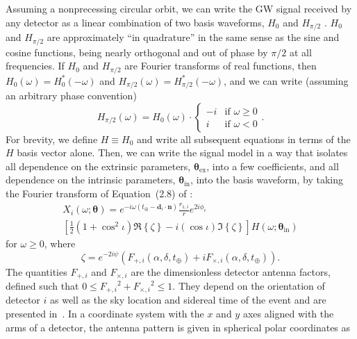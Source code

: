 \documentclass[amsmath,amssymb,aps,prx,reprint,nopreprintnumbers,nofootinbib]{revtex4-1}
\begin{document}
Assuming a nonprecessing circular orbit, we can write the \ac{GW} signal received by any detector as a linear combination of two basis waveforms, $H_0$ and $H_{\pi/2}$ \citep{PhysRevD.83.084002}. $H_0$ and $H_{\pi/2}$ are approximately ``in quadrature'' in the same sense as the sine and cosine functions, being nearly orthogonal and out of phase by ${\pi/2}$ at all frequencies. If $H_0$ and $H_{\pi/2}$ are Fourier transforms of real functions, then $H_0(\omega) = H_0^*(-\omega)$ and $H_{\pi/2}(\omega) = H_{\pi/2}^*(-\omega)$, and we can write (assuming an arbitrary phase convention)
%
\begin{equation}
    H_{\pi/2}(\omega) = H_0(\omega) \cdot
    \begin{cases}
        -i & \text{if } \omega \geq 0 \\
        i & \text{if } \omega < 0
    \end{cases}.
\end{equation}
%
For brevity, we define $H \equiv H_{0}$ and write all subsequent equations in terms of the $H$ basis vector alone. Then, we can write the signal model in a way that isolates all dependence on the extrinsic parameters, $\bm\theta_\mathrm{ex}$, into a few coefficients, and all dependence on the intrinsic parameters, $\bm\theta_\mathrm{in}$, into the basis waveform, by taking the Fourier transform of Equation~(2.8) of \cite{PhysRevD.83.084002}:
%
\begin{multline}\label{eq:full-signal-model}
    X_i(\omega; \bm\theta) = e^{-i \omega (t_\oplus - \mathbf{d}_i \cdot \mathbf{n})}
    \frac{r_{1,i}}{r}
    e^{2 i \phi_c}
    \\
    \left[
    \frac{1}{2} \left(1 + \cos^2 \iota\right) \Re \left\{\zeta\right\} - i
    \left(\cos\iota\right) \Im \left\{\zeta\right\}
    \right]
    H(\omega; \bm\theta_\mathrm{in})
\end{multline}
%
for $\omega \geq 0$, where
%
\begin{equation}
    \zeta = e^{-2 i \psi} \left(
    F_{+,i}(\alpha, \delta, t_\oplus) +
    i F_{\times,i}(\alpha, \delta, t_\oplus)
    \right).
\end{equation}
%
The quantities $F_{+,i}$ and $F_{\times,i}$ are the dimensionless detector antenna factors, defined such that $0 \leq {F_{+,i}}^2 + {F_{\times,i}}^2 \leq 1$. They depend on the orientation of detector $i$ as well as the sky location and sidereal time of the event and are presented in~\cite{ExcessPower}. In a coordinate system with the $x$ and $y$ axes aligned with the arms of a detector, the antenna pattern is given in spherical polar coordinates as
\end{document}
